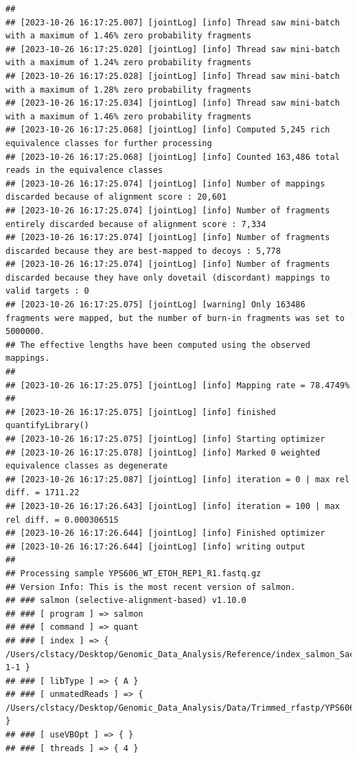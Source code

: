 \documentclass[
]{book}
\begin{document}
\begin{verbatim}
## 
## [2023-10-26 16:17:25.007] [jointLog] [info] Thread saw mini-batch with a maximum of 1.46% zero probability fragments
## [2023-10-26 16:17:25.020] [jointLog] [info] Thread saw mini-batch with a maximum of 1.24% zero probability fragments
## [2023-10-26 16:17:25.028] [jointLog] [info] Thread saw mini-batch with a maximum of 1.28% zero probability fragments
## [2023-10-26 16:17:25.034] [jointLog] [info] Thread saw mini-batch with a maximum of 1.46% zero probability fragments
## [2023-10-26 16:17:25.068] [jointLog] [info] Computed 5,245 rich equivalence classes for further processing
## [2023-10-26 16:17:25.068] [jointLog] [info] Counted 163,486 total reads in the equivalence classes 
## [2023-10-26 16:17:25.074] [jointLog] [info] Number of mappings discarded because of alignment score : 20,601
## [2023-10-26 16:17:25.074] [jointLog] [info] Number of fragments entirely discarded because of alignment score : 7,334
## [2023-10-26 16:17:25.074] [jointLog] [info] Number of fragments discarded because they are best-mapped to decoys : 5,778
## [2023-10-26 16:17:25.074] [jointLog] [info] Number of fragments discarded because they have only dovetail (discordant) mappings to valid targets : 0
## [2023-10-26 16:17:25.075] [jointLog] [warning] Only 163486 fragments were mapped, but the number of burn-in fragments was set to 5000000.
## The effective lengths have been computed using the observed mappings.
## 
## [2023-10-26 16:17:25.075] [jointLog] [info] Mapping rate = 78.4749%
## 
## [2023-10-26 16:17:25.075] [jointLog] [info] finished quantifyLibrary()
## [2023-10-26 16:17:25.075] [jointLog] [info] Starting optimizer
## [2023-10-26 16:17:25.078] [jointLog] [info] Marked 0 weighted equivalence classes as degenerate
## [2023-10-26 16:17:25.087] [jointLog] [info] iteration = 0 | max rel diff. = 1711.22
## [2023-10-26 16:17:26.643] [jointLog] [info] iteration = 100 | max rel diff. = 0.000306515
## [2023-10-26 16:17:26.644] [jointLog] [info] Finished optimizer
## [2023-10-26 16:17:26.644] [jointLog] [info] writing output 
## 
## Processing sample YPS606_WT_ETOH_REP1_R1.fastq.gz
## Version Info: This is the most recent version of salmon.
## ### salmon (selective-alignment-based) v1.10.0
## ### [ program ] => salmon 
## ### [ command ] => quant 
## ### [ index ] => { /Users/clstacy/Desktop/Genomic_Data_Analysis/Reference/index_salmon_Saccharomyces_cerevisiae.R64-1-1 }
## ### [ libType ] => { A }
## ### [ unmatedReads ] => { /Users/clstacy/Desktop/Genomic_Data_Analysis/Data/Trimmed_rfastp/YPS606_WT_ETOH_REP1_R1.fastq.gz }
## ### [ useVBOpt ] => { }
## ### [ threads ] => { 4 }

\end{verbatim}
\end{document}
